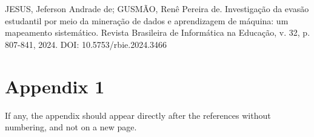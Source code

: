 \documentclass[english, spanish, brazilian]{RBIEarticle} %
\begin{document}
JESUS, Jeferson Andrade de; GUSMÃO, Renê Pereira de. Investigação da evasão estudantil por meio da mineração de dados e aprendizagem de máquina: um mapeamento sistemático. Revista Brasileira de Informática na Educação, v. 32, p. 807-841, 2024. DOI: 10.5753/rbie.2024.3466




\iffalse %
     \section*{Appendix 1}
    \label{apendice1}
    
    If any, the appendix should appear directly after the references without numbering, and not on a new page.
    
\end{document}

